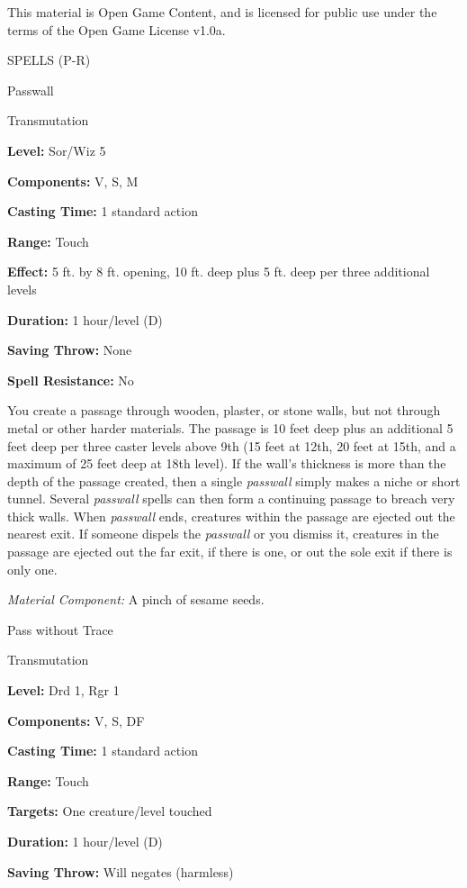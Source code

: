 \documentclass{article}
\begin{document}
This material is Open Game Content, and is licensed for public use under the terms 
of the Open Game License v1.0a.

{\LARGE{}SPELLS (P-R)}

\vspace{12pt}
Passwall

Transmutation

\textbf{Level:} Sor/Wiz 5

\textbf{Components:} V, S, M

\textbf{Casting Time:} 1 standard action

\textbf{Range:} Touch

\textbf{Effect:} 5 ft. by 8 ft. opening, 10 ft. deep plus 5 ft. deep per three 
additional levels

\textbf{Duration:} 1 hour/level (D)

\textbf{Saving Throw:} None

\textbf{Spell Resistance:} No

You create a passage through wooden, plaster, or stone walls, but not through metal 
or other harder materials. The passage is 10 feet deep plus an additional 5 feet 
deep per three caster levels above 9th (15 feet at 12th, 20 feet at 15th, and a 
maximum of 25 feet deep at 18th level). If the wall's thickness is more than the 
depth of the passage created, then a single \textit{passwall }simply makes a niche 
or short tunnel. Several \textit{passwall }spells can then form a continuing passage 
to breach very thick walls. When \textit{passwall }ends, creatures within the passage 
are ejected out the nearest exit. If someone dispels the \textit{passwall }or you 
dismiss it, creatures in the passage are ejected out the far exit, if there is 
one, or out the sole exit if there is only one.

\textit{Material Component: }A pinch of sesame seeds.

\vspace{12pt}
Pass without Trace

Transmutation

\textbf{Level:} Drd 1, Rgr 1

\textbf{Components:} V, S, DF

\textbf{Casting Time:} 1 standard action

\textbf{Range:} Touch

\textbf{Targets:} One creature/level touched

\textbf{Duration:} 1 hour/level (D)

\textbf{Saving Throw: }Will negates (harmless)
\end{document}

